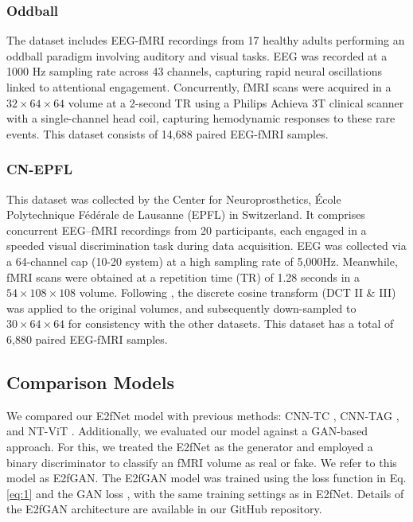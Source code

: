 \subsubsection{Oddball}
The dataset includes EEG-fMRI recordings from 17 healthy adults performing an oddball paradigm involving auditory and visual tasks. 
EEG was recorded at a 1000 Hz sampling rate across 43 channels, capturing rapid neural oscillations linked to attentional engagement. 
Concurrently, fMRI scans were acquired in a $32 \times 64 \times 64$ volume at a 2-second TR using a Philips Achieva 3T clinical scanner with a single-channel head coil, capturing hemodynamic responses to these rare events. 
This dataset consists of 14,688 paired EEG-fMRI samples. 

\subsubsection{CN-EPFL}
This dataset was collected by the Center for Neuroprosthetics, École Polytechnique Fédérale de Lausanne (EPFL) in Switzerland. 
It comprises concurrent EEG–fMRI recordings from 20 participants, each engaged in a speeded visual discrimination task during data acquisition. 
EEG was collected via a 64-channel cap (10-20 system) at a high sampling rate of 5,000Hz. 
Meanwhile, fMRI scans were obtained at a repetition time (TR) of 1.28 seconds in a $54 \times 108 \times 108$ volume. 
Following \cite{calhas2022eeg}, the discrete cosine transform (DCT II \& III) \cite{ahmed2006discrete} was applied to the original volumes, and subsequently down-sampled to $30 \times 64 \times 64$ for consistency with the other datasets. 
This dataset has a total of 6,880 paired EEG-fMRI samples.

\subsection{Comparison Models}
We compared our E2fNet model with previous methods: CNN-TC \cite{liu2019convolutional}, CNN-TAG \cite{calhas2022eeg}, and NT-ViT \cite{lanzino2024nt}. 
Additionally, we evaluated our model against a GAN-based approach. 
For this, we treated the E2fNet as the generator and employed a binary discriminator to classify an fMRI volume as real or fake. 
We refer to this model as E2fGAN. 
The E2fGAN model was trained using the loss function in Eq. \ref{eq:1} and the GAN loss \cite{goodfellow2014generative}, with the same training settings as in E2fNet. 
Details of the E2fGAN architecture are available in our GitHub repository. 

